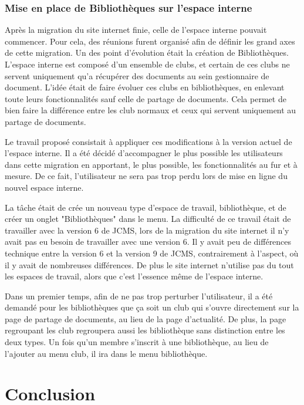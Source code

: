 \documentclass[12pt,a4paper]{article}
\begin{document}
\subsubsection{Mise en place de Bibliothèques sur l'espace interne}
Après la migration du site internet finie, celle de l'espace interne pouvait commencer. Pour cela, des réunions furent organisé afin de définir les grand axes de cette migration. Un des point d'évolution était la création de Bibliothèques. L'espace interne est composé d'un ensemble de clubs, et certain de ces clubs ne servent uniquement qu'a récupérer des documents au sein gestionnaire de document. L'idée était de faire évoluer ces clubs en bibliothèques, en enlevant toute leurs fonctionnalités sauf celle de partage de documents. Cela permet de bien faire la différence entre les club normaux et ceux qui servent uniquement au partage de documents.\par 
Le travail proposé consistait à appliquer ces modifications à la version actuel de l'espace interne. Il a été décidé d'accompagner le plus possible les utilisateurs dans cette migration en apportant, le plus possible, les fonctionnalités au fur et à mesure. De ce fait, l'utilisateur ne sera pas trop perdu lors de mise en ligne du nouvel espace interne.\par 
La tâche était de crée un nouveau type d'espace de travail, bibliothèque, et de créer un onglet "Bibliothèques" dans le menu. La difficulté de ce travail était de travailler avec la version 6 de \gls{JCMS}, lors de la migration du site internet il n'y avait pas eu besoin de travailler avec une version 6. Il y avait peu de différences technique entre la version 6 et la version 9 de \gls{JCMS}, contrairement à l'aspect, où il y avait de nombreuses différences. De plus le site internet n'utilise pas du tout les espaces de travail, alors que c'est l'essence même de l'espace interne.\par 
Dans un premier temps, afin de ne pas trop perturber l'utilisateur, il a été demandé pour les bibliothèques que ça soit un club qui s'ouvre directement sur la page de partage de documents, au lieu de la page d'actualité. De plus, la page regroupant les club regroupera aussi les bibliothèque sans distinction entre les deux types. Un fois qu'un membre s'inscrit à une bibliothèque, au lieu de l'ajouter au menu club, il ira dans le menu bibliothèque.\par

\newpage
\section{Conclusion}
\printglossaries
\listoffigures
\end{document}
